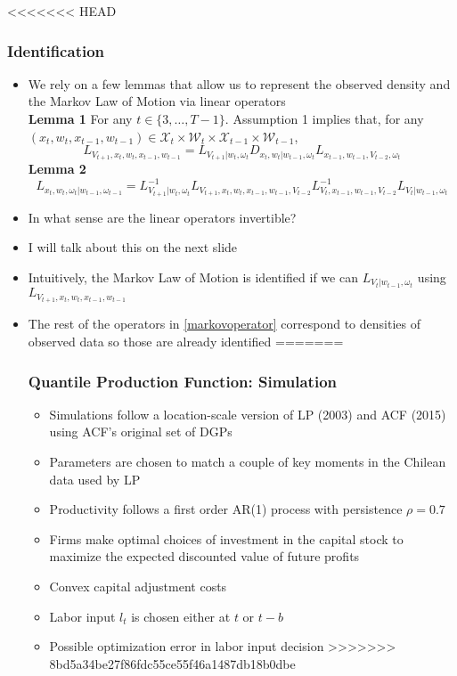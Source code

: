\documentclass{beamer}
\begin{document}
\begin{frame}
\begin{itemize}
\begin{frame}
\begin{itemize}
\begin{frame}
\begin{itemize}
<<<<<<< HEAD
\begin{frame}
\frametitle{Identification}
\begin{itemize}
\item We rely on a few lemmas that allow us to represent the observed density and the Markov Law of Motion via linear operators\\
\textbf{Lemma 1}
For any $t\in\{3,\dots, T-1\}$. Assumption 1 implies that, for any $(x_{t}, w_{t}, x_{t-1}, w_{t-1})\in \mathcal{X}_{t}\times \mathcal{W}_{t}\times \mathcal{X}_{t-1}\times \mathcal{W}_{t-1}$,
\begin{equation}\label{obsoperator}
L_{V_{t+1},x_{t}, w_{t}, x_{t-1}, w_{t-1}}=L_{V_{t+1}|w_{t}, \omega_{t}}D_{x_{t}, w_{t}|w_{t-1}, \omega_{t}}L_{x_{t-1}, w_{t-1}, V_{t-2}, \omega_{t}}
\end{equation}
\textbf{Lemma 2}
\small
\begin{equation}\label{markovoperator}
L_{x_{t},w_{t},\omega_{t}|w_{t-1},\omega_{t-1}}=L^{-1}_{V_{t+1}|w_{t},\omega_{t}}L_{V_{t+1},x_{t},w_{t},x_{t-1}, w_{t-1}, V_{t-2}}L^{-1}_{V_{t},x_{t-1},w_{t-1},V_{t-2}}L_{V_{t}|w_{t-1},\omega_{t}}
\end{equation}
\item In what sense are the linear operators invertible?
\item I will talk about this on the next slide
\item Intuitively, the Markov Law of Motion is identified if we can $L_{V_{t}|w_{t-1},\omega_{t}}$ using $L_{V_{t+1},x_{t}, w_{t}, x_{t-1}, w_{t-1}}$
\item The rest of the operators in \eqref{markovoperator} correspond to densities of observed data so those are already identified
=======

\begin{frame}
\frametitle{Quantile Production Function: Simulation}
\begin{itemize}
	\item Simulations follow a location-scale version of LP (2003) and ACF (2015) using ACF's original set of DGPs 
	\item Parameters are chosen to match a couple of key moments in the Chilean data used by LP
	\item Productivity follows a first order AR(1) process with persistence $\rho=0.7$
	\item Firms make optimal choices of investment in the capital stock to maximize the expected discounted value of future profits
	\item Convex capital adjustment costs
	\item Labor input $l_{t}$ is chosen either at $t$ or $t-b$
	\item Possible optimization error in labor input decision
>>>>>>> 8bd5a34be27f86fdc55ce55f46a1487db18b0dbe
\end{itemize}
\end{frame}


\end{itemize}
\end{frame}
\end{itemize}
\end{frame}
\end{itemize}
\end{frame}
\end{itemize}
\end{frame}
\end{document}

